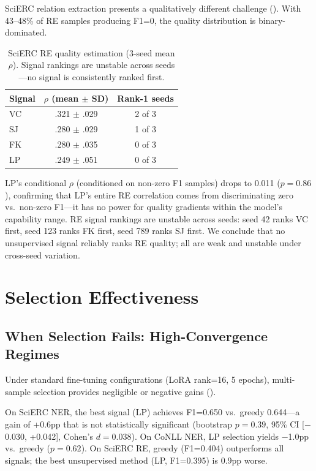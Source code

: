 \documentclass[11pt,a4paper]{article}
\begin{document}
SciERC relation extraction presents a qualitatively different challenge ().
With 43--48\% of RE samples producing F1=0, the quality distribution is binary-dominated.

\begin{table}[t]
\centering
\small
\caption{SciERC RE quality estimation (3-seed mean $\rho$). Signal rankings are unstable across seeds---no signal is consistently ranked first.}
\label{tab:re_qe}
\begin{tabular}{lcc}
\toprule
\textbf{Signal} & \textbf{$\rho$ (mean $\pm$ SD)} & \textbf{Rank-1 seeds} \\
\midrule
VC   & .321 $\pm$ .029 & 2 of 3 \\
SJ   & .280 $\pm$ .029 & 1 of 3 \\
FK   & .280 $\pm$ .035 & 0 of 3 \\
LP   & .249 $\pm$ .051 & 0 of 3 \\
\bottomrule
\end{tabular}
\end{table}

LP's conditional $\rho$ (conditioned on non-zero F1 samples) drops to 0.011 ($p{=}0.86$), confirming that LP's entire RE correlation comes from discriminating zero vs.\ non-zero F1---it has no power for quality gradients within the model's capability range.
RE signal rankings are unstable across seeds: seed 42 ranks VC first, seed 123 ranks FK first, seed 789 ranks SJ first.
We conclude that no unsupervised signal reliably ranks RE quality; all are weak and unstable under cross-seed variation.

\section{Selection Effectiveness}

\subsection{When Selection Fails: High-Convergence Regimes}

Under standard fine-tuning configurations (LoRA rank=16, 5 epochs), multi-sample selection provides negligible or negative gains ().

On SciERC NER, the best signal (LP) achieves F1=0.650 vs.\ greedy 0.644---a gain of +0.6pp that is not statistically significant (bootstrap $p{=}0.39$, 95\% CI [$-$0.030, +0.042], Cohen's $d{=}0.038$).
On CoNLL NER, LP selection yields $-$1.0pp vs.\ greedy ($p{=}0.62$).
On SciERC RE, greedy (F1=0.404) outperforms all signals; the best unsupervised method (LP, F1=0.395) is 0.9pp worse.
\end{document}
